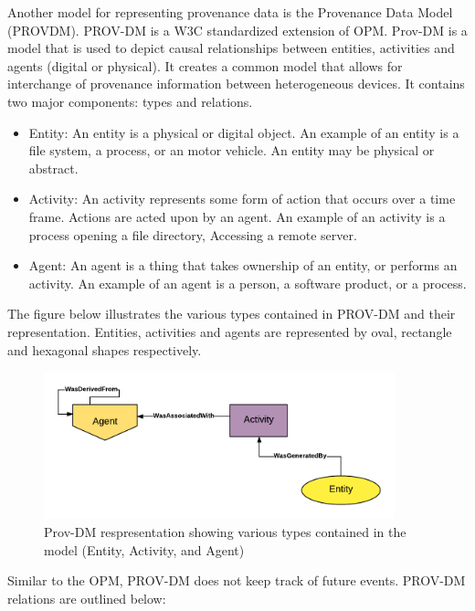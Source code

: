 Another model for representing provenance data is the Provenance Data Model (PROV\-DM). PROV-DM is a W3C standardized extension of OPM. Prov-DM is a model that is used to depict causal relationships between entities, activities and agents (digital or physical). It creates a common model that allows for interchange of provenance information between heterogeneous devices. It contains two major components: types and relations. 


\begin{itemize}

\item Entity: An entity is a physical or digital object. An example of an entity is a file system, a process, or an motor vehicle. An entity may be physical or abstract.

\item Activity: An activity represents some form of action that occurs over a time frame. Actions are acted upon by an agent. An example of an activity is a process opening a file directory, Accessing a remote server.

\item Agent: An agent is a thing that takes ownership of an entity, or performs an activity. An example of an agent is a person, a software product, or a process.
\end{itemize}

The figure below illustrates the various types contained in PROV-DM and their representation. Entities, activities and agents are represented by oval, rectangle and hexagonal shapes respectively.

\begin{figure}[h]
\begin{center}

\includegraphics[width=4.0in]{prov_dm_1.PNG}
\end{center}
\caption{Prov-DM respresentation showing various types contained in the model (Entity, Activity, and Agent) }
\end{figure}

Similar to the OPM, PROV-DM does not keep track of future events. PROV-DM relations are outlined below:



